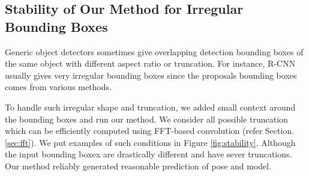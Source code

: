 \documentclass[10pt,twocolumn,letterpaper]{article}
\begin{document}
\subsection{Stability of Our Method for Irregular Bounding Boxes}

Generic object detectors sometimes give overlapping detection bounding boxes of the same object with different aspect ratio or truncation. For instance, R-CNN \cite{Girshick14} usually gives very irregular bounding boxes since the proposals bounding boxes comes from various methods.

To handle such irregular shape and truncation, we added small context around the bounding boxes and run our method. We consider all possible truncation which can be efficiently computed using FFT-based convolution (refer Section. \ref{sec:fft}). We put examples of such conditions in Figure \ref{fig:stability}. Although the input bounding boxex are drastically different and have sever truncations. Our method reliably generated reasonable prediction of pose and model.
\end{document}
